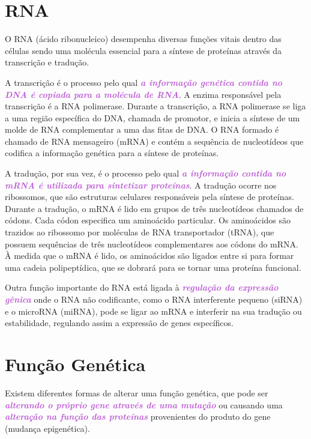 \documentclass[11pt,a4paper]{article}
\begin{document}
\section{RNA}

	O RNA (ácido ribonucleico) desempenha diversas funções vitais dentro das células sendo uma molécula essencial para a síntese de proteínas através da transcrição e tradução.
	
	A transcrição é o processo pelo qual \textcolor{MediumOrchid}{\textbf{\textit{a informação genética contida no DNA é copiada para a molécula de RNA}}}. A enzima responsável pela transcrição é a RNA polimerase. Durante a transcrição, a RNA polimerase se liga a uma região específica do DNA, chamada de promotor, e inicia a síntese de um molde de RNA complementar a uma das fitas de DNA. O RNA formado é chamado de RNA mensageiro (mRNA) e contém a sequência de nucleotídeos que codifica a informação genética para a síntese de proteínas.

	A tradução, por sua vez, é o processo pelo qual \textcolor{MediumOrchid}{\textbf{\textit{a informação contida no mRNA é utilizada para sintetizar proteínas}}}. A tradução ocorre nos ribossomos, que são estruturas celulares responsáveis pela síntese de proteínas. Durante a tradução, o mRNA é lido em grupos de três nucleotídeos chamados de códons. Cada códon especifica um aminoácido particular. Os aminoácidos são trazidos ao ribossomo por moléculas de RNA transportador (tRNA), que possuem sequências de três nucleotídeos complementares aos códons do mRNA. À medida que o mRNA é lido, os aminoácidos são ligados entre si para formar uma cadeia polipeptídica, que se dobrará para se tornar uma proteína funcional.

	Outra função importante do RNA está ligada à \textcolor{MediumOrchid}{\textbf{\textit{regulação da expressão gênica}}} onde o RNA não codificante, como o RNA interferente pequeno (siRNA) e o microRNA (miRNA), pode se ligar ao mRNA e interferir na sua tradução ou estabilidade, regulando assim a expressão de genes específicos.



\section{Função Genética}
      
	Existem diferentes formas de alterar uma função genética, que pode ser \textcolor{MediumOrchid}{\textbf{\textit{alterando o próprio gene através de uma mutação}}} ou causando uma \textcolor{MediumOrchid}{\textbf{\textit{alteração na função das proteínas}}} provenientes do produto do gene (mudança epigenética).
\end{document}
